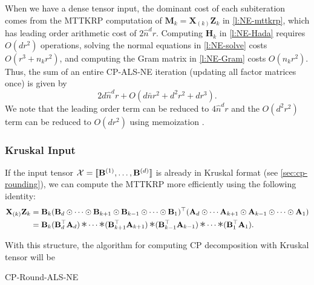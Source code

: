 \documentclass{article}
\newcommand{\mat}[1]{\mathbf{#1}}
\newcommand{\T}[2][]{#1{\mathbf{\cal{#2}}}} 						%
\DeclareMathOperator*{\hada}{\scalebox{1.5}{$\ast$}}
\begin{document}
When we have a dense tensor input, the dominant cost of each subiteration comes from the MTTKRP computation of $\mat{M}_k = \mat{X}_{(k)}\mat{Z}_k$ in \cref{l:NE-mttkrp}, which has leading order arithmetic cost of $2\hat n^dr$.
Computing $\mat{H}_k$ in \cref{l:NE-Hada} requires $O(dr^2)$ operations, solving the normal equations in \cref{l:NE-solve} costs $O(r^3+n_kr^2)$, and computing the Gram matrix in \cref{l:NE-Gram} costs $O(n_kr^2)$.
Thus, the sum of an entire CP-ALS-NE iteration (updating all factor matrices once) is given by
\begin{equation*}
2d\hat n^dr + O(d\bar n r^2 + d^2r^2 + dr^3).
\end{equation*}
We note that the leading order term can be reduced to $4\hat n^d r$ and the $O(d^2r^2)$ term can be reduced to $O(dr^2)$ using memoization \cite{phan2013fast}. 
\subsubsection{Kruskal Input}
If the input tensor $\T{X}=[\![\mat{B}^{(1)}, \dots ,\mat{B}^{(d)}]\!]$ is already in Kruskal format (see \cref{sec:cp-rounding}), we can compute the MTTKRP more efficiently using the following identity:
\begin{align*}
  \mat{X}_{(k)}\mat{Z}_k &= \mat{B}_k(\mat{B}_d \odot \dots \odot \mat{B}_{k+1} \odot \mat{B}_{k-1} \odot \dots \odot \mat{B}_1)^\top(\mat{A}_d \odot \cdots \mat{A}_{k+1} \odot \mat{A}_{k-1} \odot \cdots \odot \mat{A}_1) \\
 &= \mat{B}_k(\mat{B}_d^\top\mat{A}_d) \hada \cdots \hada (\mat{B}_{k+1}^\top\mat{A}_{k+1}) \hada (\mat{B}_{k-1}^\top\mat{A}_{k-1}) \hada \cdots \hada (\mat{B}_1^\top\mat{A}_1).  
\end{align*}

With this structure, the algorithm for computing CP decomposition with Kruskal tensor will be  
\begin{algorithm}[!ht]
  \caption{CP-Round-ALS-NE}
  \label{alg:cp-als-ne-k}
  
  
\end{algorithm}

\end{document}
